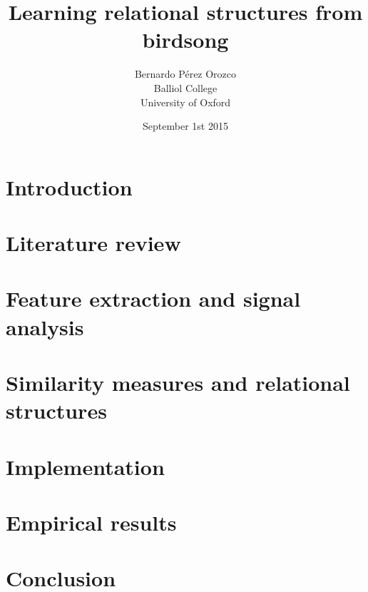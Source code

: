 \documentclass[pdftex,12pt,a4paper]{report}
\title{Learning relational structures from birdsong}
\author{Bernardo Pérez Orozco\\Balliol College\\University of Oxford}
\date{ September 1st 2015 }
\theoremstyle{definition}
\theoremstyle{remark}
\begin{document}
 

\chapter{Introduction}

 
\chapter{Literature review}



\chapter{Feature extraction and signal analysis}
 

 
\chapter{Similarity measures and relational structures}



\chapter{Implementation}



\chapter{Empirical results}



\chapter{Conclusion}






\end{document}
